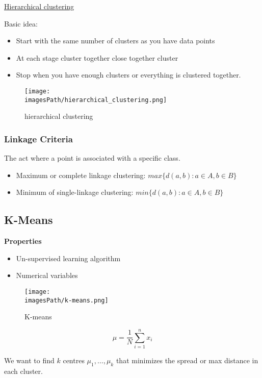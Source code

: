 \href{https://www.youtube.com/watch?v=7xHsRkOdVwo}{Hierarchical clustering}

Basic idea:
\begin{itemize}
    \item Start with the same number of clusters as you have data points
    \item At each stage cluster together close together cluster 
    \item Stop when you have enough clusters or everything is clustered together.
\end{itemize}

\begin{figure}[!h]
    \centering
    \texttt{[image: \\imagesPath/hierarchical\_clustering.png]}
    \caption{hierarchical clustering}
\end{figure}

\subsubsection{Linkage Criteria}
The act where a point is associated with a specific class.
\begin{itemize}
    \item Maximum or complete linkage clustering:
    $max\{ d(a,b): a\in A, b\in B\}$
    \item Minimum of single-linkage clustering:
    $min\{ d(a,b): a\in A, b\in B\}$
\end{itemize}

\subsection{K-Means}
\textbf{Properties}
\begin{itemize}
    \item Un-supervised learning algorithm
    \item Numerical variables 
\end{itemize}
\begin{figure}[!h]
    \centering
    \texttt{[image: \\imagesPath/k-means.png]}
    \caption{K-means}
\end{figure}

\begin{equation*}
    \mu = \frac{1}{N} \sum_{i=1}^{n} x_i
\end{equation*}

We want to find $k$ centres $\mu_1,\ldots,\mu_k$ that minimizes the spread or max 
distance in each cluster. 

